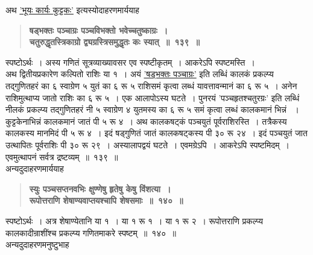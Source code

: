 \documentclass[11pt, openany]{book}
\begin{document}
\begin{sloppypar}

{\small अथ \hyperref[9.134]{'भूयः कार्यः कुट्टकः'} इत्यस्योदाहरणमार्ययाह\textendash }

 \label{9.139}
\begin{quote}
{\large \textbf{{\color{purple}षड्भक्तः पञ्चाग्रः पञ्चविभक्तो भवेच्चतुष्काग्रः~।\\
चतुरुद्धृतस्त्रिकाग्रो द्व्यग्रस्त्रिसमुद्धृतः कः स्यात्~॥~१३९~॥}}}
\end{quote}

स्पष्टोऽर्थः~। अस्य गणितं सूत्रव्याख्यावसर एव स्पष्टीकृतम्~। आकरेऽपि स्पष्टमस्ति~।\\

अथ द्वितीयप्रकारेण कल्पितो राशिः या १~। अयं \hyperref[9.139]{'षड्भक्तः पञ्चाग्रः'} इति लब्धिं कालकं प्रकल्प्य तद्गुणितहरं का ६ स्वाग्रेण ५ युतं का ६ रू ५ राशिसमं कृत्वा लब्धं यावत्तावन्मानं का ६ रू ५~। अनेन राशिमुत्थाप्य जातो राशिः का ६ रू ५~। एक आलापोऽस्य घटते~। पुनरयं 'पञ्चहृतश्चतुरग्रः' इति लब्धिं नीलकं प्रकल्प्य तद्गुणितहरं नी ५ स्वाग्रेण ४ युतमस्य का ६ रू ५ समं कृत्वा लब्धं कालकमानं भिन्नं ~। कुट्टकेनाभिन्नं कालकमानं जातं पी ५ रू ४~। अथ कालकषट्कं पञ्चयुतं पूर्वराशिरस्ति~। तत्रैकस्य कालकस्य मानमिदं पी ५ रू ४~। इदं षड्गुणितं जातं कालकषट्कस्य पी ३० रू २४~। इदं पञ्चयुतं जात उत्थापितः पूर्वराशिः पी ३० रू २९~। अस्यालापद्वयं घटते~। एवमग्रेऽपि~। आकरेऽपि स्पष्टमिदम्~। एवमुत्थापनं सर्वत्र द्रष्टव्यम्~॥~१३९~॥\\

{\small अन्यदुदाहरणमार्ययाह\textendash }

 \label{9.140}
\begin{quote}
{\large \textbf{{\color{purple}स्युः पञ्चसप्तनवभिः क्षुण्णेषु हृतेषु केषु विंशत्या~।\\
रूपोत्तराणि शेषाण्यवाप्तयश्चापि शेषसमाः~॥~१४०~॥}}}
\end{quote}

स्पष्टोऽर्थः~। अत्र शेषाण्येतानि या १~। या १ रू १~। या १ रू २~। रूपोत्तराणि प्रकल्प्य कालकादीन्राशींश्च प्रकल्प्य गणितमाकरे स्पष्टम्~॥~१४०~॥\\

{\small अन्यदुदाहरणमनुष्टुभाह\textendash }


\end{sloppypar}
\end{document}
